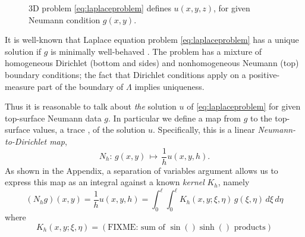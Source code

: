 \documentclass[letterpaper,final,12pt,reqno]{amsart}
\theoremstyle{cstyle}
\theoremstyle{cstyle*}
\theoremstyle{dstyle}
\newcommand{\grad}{\nabla}
\begin{document}
\begin{figure}[ht]
\caption{3D problem \eqref{eq:laplaceproblem} defines $u(x,y,z)$, for given Neumann condition $g(x,y)$.}
\label{fig:laplaceproblem}
\end{figure}

It is well-known that Laplace equation problem \eqref{eq:laplaceproblem} has a unique solution if $g$ is minimally well-behaved \cite{Elmanetal2014,Evans2010}.  The problem has a mixture of homogeneous Dirichlet (bottom and sides) and nonhomogeneous Neumann (top) boundary conditions; the fact that Dirichlet conditions apply on a positive-measure part of the boundary of $\Lambda$ implies uniqueness.

Thus it is reasonable to talk about \emph{the} solution $u$ of \eqref{eq:laplaceproblem} for given top-surface Neumann data $g$.  In particular we define a map from $g$ to the top-surface values, a trace \cite{Evans2010}, of the solution $u$.  Specifically, this is a linear \emph{Neumann-to-Dirichlet map},
\begin{equation}
N_h : \, g(x,y) \, \mapsto \, \frac{1}{h} u(x,y,h).  \label{eq:ntod}
\end{equation}
As shown in the Appendix, a separation of variables argument allows us to express this map as an integral against a known \emph{kernel} $K_h$, namely
\begin{equation}
(N_h g)(x,y) = \frac{1}{h} u(x,y,h) = \int_0^\ell \int_0^\ell K_h(x,y;\xi,\eta)\, g(\xi,\eta)\,d\xi\,d\eta  \label{eq:ntodformula}
\end{equation}
where
\begin{equation}
K_h(x,y;\xi,\eta) = (\text{FIXME: sum of $\sin() \sinh()$ products})  \label{eq:kernelformula}
\end{equation}
\end{document}
